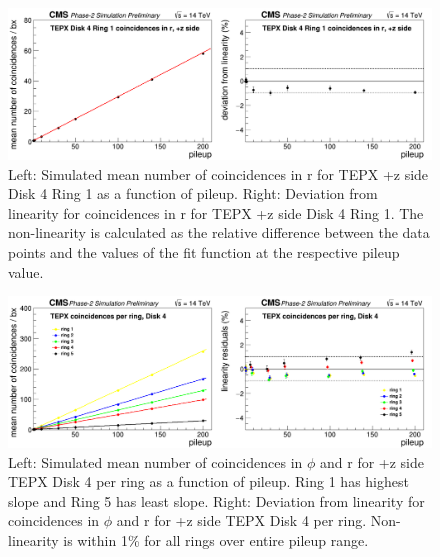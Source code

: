 \begin{figure}[H]
  \centering
  \includegraphics[width=1\columnwidth]{ashish_thesis/coincidencesinrD4R1z+.png}
  \caption{Left: Simulated mean number of coincidences in r for TEPX +z side Disk 4 Ring 1 as a function of pileup. Right: Deviation from linearity for coincidences in r for TEPX +z side Disk 4 Ring 1. The non-linearity is calculated as the relative difference between the data points and the values of the fit function at the respective pileup value.}
  \label{fig:CMS}
\end{figure}





\begin{figure}[H]
  \centering
  \includegraphics[width=1\columnwidth]{ashish_thesis/coincidencesperringD+4.png}
  \caption{Left: Simulated mean number of coincidences in $\phi$ and r for +z side TEPX Disk 4 per ring as a function of pileup. Ring 1 has highest slope and Ring 5 has least slope. Right: Deviation from linearity for coincidences in $\phi$ and r for +z side TEPX Disk 4 per ring. Non-linearity is within 1\% for all rings over entire pileup range.}
  \label{fig:CMS}
\end{figure}








